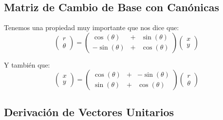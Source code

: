 \documentclass[12pt, fleqn]{report}                             %
\newcommand{\Wrap}[1]{\left( #1 \right)}                        %
\newcommand{\pVector}[1]{                                       %
        \ensuremath{\begin{pmatrix}#1\end{pmatrix}}                 %
    }
\newcommand{\Cos}[1]{\cos\Wrap{#1}}                             %
\newcommand{\Sin}[1]{\sin\Wrap{#1}}                             %
\begin{document}
            \subsection{Matriz de Cambio de Base con Canónicas}
                Tenemos una propiedad muy importante que nos dice que:
                \begin{equation}
                    \pVector{r \\ \theta} = 
                        \pVector{
                            \Cos{\theta} &+& \Sin{\theta} \\
                           -\Sin{\theta} &+& \Cos{\theta} 
                        }
                        \pVector{x \\ y}
                \end{equation}

                Y también que:
                \begin{equation}
                    \pVector{x \\ y} = 
                        \pVector{
                            \Cos{\theta} &+& -\Sin{\theta} \\
                            \Sin{\theta} &+& \Cos{\theta} 
                        }
                        \pVector{r \\ \theta}
                \end{equation}             


            \clearpage
            \subsection{Derivación de Vectores Unitarios}
\end{document}
